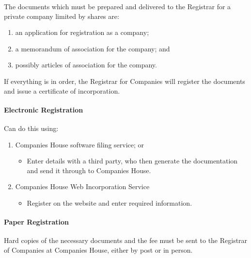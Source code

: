 \documentclass[
]{article}
\providecommand{\tightlist}{%
  \setlength{\itemsep}{0pt}\setlength{\parskip}{0pt}}
\begin{document}
The documents which must be prepared and delivered to the Registrar for
a private company limited by shares are:

\begin{enumerate}
\def\labelenumi{\arabic{enumi}.}
\tightlist
\item
  an application for registration as a company;
\item
  a memorandum of association for the company; and
\item
  possibly articles of association for the company.
\end{enumerate}

If everything is in order, the Registrar for Companies will register the
documents and issue a certificate of incorporation.

\hypertarget{electronic-registration}{%
\paragraph{Electronic Registration}\label{electronic-registration}}

Can do this using:

\begin{enumerate}
\def\labelenumi{\arabic{enumi}.}
\tightlist
\item
  Companies House software filing service; or

  \begin{itemize}
  \tightlist
  \item
    Enter details with a third party, who then generate the
    documentation and send it through to Companies House.
  \end{itemize}
\item
  Companies House Web Incorporation Service

  \begin{itemize}
  \tightlist
  \item
    Register on the website and enter required information.
  \end{itemize}
\end{enumerate}

\hypertarget{paper-registration}{%
\paragraph{Paper Registration}\label{paper-registration}}

Hard copies of the necessary documents and the fee must be sent to the
Registrar of Companies at Companies House, either by post or in person.
\end{document}
